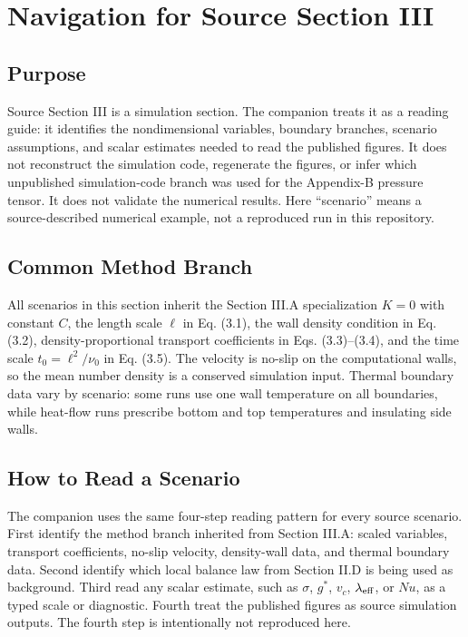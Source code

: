 \section{Navigation for Source Section III}
\label{sec:numerical-results-overview}


\subsection*{Purpose}

Source Section III is a simulation section.  The companion treats it as a
reading guide: it identifies the nondimensional variables, boundary branches,
scenario assumptions, and scalar estimates needed to read the published figures.
It does not reconstruct the simulation code, regenerate the figures, or infer
which unpublished simulation-code branch was used for the Appendix-B pressure
tensor.  It does not validate the numerical results.
Here ``scenario'' means a source-described numerical example, not a reproduced
run in this repository.

\subsection*{Common Method Branch}

All scenarios in this section inherit the Section III.A specialization
\(K=0\) with constant \(C\), the length scale \(\ell\) in Eq. (3.1), the wall
density condition in Eq. (3.2), density-proportional transport coefficients in
Eqs. (3.3)--(3.4), and the time scale \(t_0=\ell^2/\nu_0\) in Eq. (3.5).  The
velocity is no-slip on the computational walls, so the mean number density is a
conserved simulation input.  Thermal boundary data vary by scenario: some runs
use one wall temperature on all boundaries, while heat-flow runs prescribe
bottom and top temperatures and insulating side walls.


\subsection*{How to Read a Scenario}

The companion uses the same four-step reading pattern for every source
scenario.  First identify the method branch inherited from Section III.A:
scaled variables, transport coefficients, no-slip velocity, density-wall data,
and thermal boundary data.  Second identify which local balance law from
Section II.D is being used as background.  Third read any scalar estimate, such
as \(\sigma\), \(g^*\), \(v_c\), \(\lambda_{\rm eff}\), or \(Nu\), as a typed
scale or diagnostic.  Fourth treat the published figures as source simulation
outputs.  The fourth step is intentionally not reproduced here.

